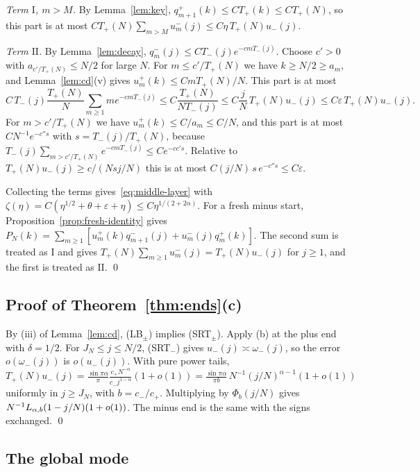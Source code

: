 \emph{Term $\mathrm I$, $m>M$.} By Lemma~\ref{lem:key}, $q^\plus_{m+1}(k)\le CT_\plus(k)\le CT_\plus(N)$,
so this part is at most $CT_\plus(N)\sum_{m>M}u^\minus_m(j)\le C\eta\,T_\plus(N)u_\minus(j)$.

\emph{Term $\mathrm{II}$.} By Lemma~\ref{lem:decay}, $q^\minus_m(j)\le CT_\minus(j)e^{-cmT_\minus(j)}$.
Choose $c'>0$ with $a_{c'/T_\plus(N)}\le N/2$ for large $N$. For $m\le c'/T_\plus(N)$ we have
$k\ge N/2\ge a_m$, and Lemma~\ref{lem:cd}(v) gives $u^\plus_m(k)\le CmT_\plus(N)/N$. This part
is at most
\[
 C\,T_\minus(j)\frac{T_\plus(N)}N\sum_{m\ge1}me^{-cmT_\minus(j)}\le C\frac{T_\plus(N)}{NT_\minus(j)}
 \le C\frac jN\,T_\plus(N)u_\minus(j)\le C\varepsilon\,T_\plus(N)u_\minus(j).
\]
For $m>c'/T_\plus(N)$ we have $u^\plus_m(k)\le C/a_m\le C/N$, and this part is at most
$CN^{-1}e^{-c''s}$ with $s=T_\minus(j)/T_\plus(N)$, because $T_\minus(j)\sum_{m>c'/T_\plus(N)}e^{-cmT_\minus(j)}\le Ce^{-cc's}$.
Relative to $T_\plus(N)u_\minus(j)\ge c/(Nsj/N)$ this is at most
$C(j/N)\,s\,e^{-c''s}\le C\varepsilon$.

Collecting the terms gives~\eqref{eq:middle-layer} with
$\zeta(\eta)=C(\eta^{1/2}+\theta+\varepsilon+\eta)\le C\eta^{1/(2+2\alpha)}$.
For a fresh minus start, Proposition~\ref{prop:fresh-identity} gives
$P_N(k)=\sum_{m\ge1}[u^\plus_m(k)q^\minus_{m+1}(j)+u^\minus_m(j)q^\plus_m(k)]$. The second sum
is treated as $\mathrm I$ and gives $T_\plus(N)\sum_{m\ge1}u^\minus_m(j)=T_\plus(N)u_\minus(j)$ for
$j\ge1$, and the first is treated as $\mathrm{II}$. \qed

\subsection{Proof of Theorem~\ref{thm:ends}(c)}

By (iii) of Lemma~\ref{lem:cd}, (LB$_\pm$) implies (SRT$_\pm$). Apply (b) at the plus end
with $\delta=1/2$. For $J_N\le j\le N/2$, (SRT$_\minus$) gives $u_\minus(j)\asymp\omega_\minus(j)$,
so the error $o(\omega_\minus(j))$ is $o(u_\minus(j))$. With pure power tails,
$T_\plus(N)u_\minus(j)=\frac{\sin\pi\alpha}\pi\frac{c_+N^{-\alpha}}{c_-j^{1-\alpha}}(1+o(1))
=\frac{\sin\pi\alpha}{\pi b}\,N^{-1}(j/N)^{\alpha-1}(1+o(1))$ uniformly in $j\ge J_N$, with
$b=c_-/c_+$. Multiplying by $\Phi_b(j/N)$ gives $N^{-1}L_{\alpha,b}(1-j/N)(1+o(1))$. The minus end is
the same with the signs exchanged. \qed

\subsection{The global mode}


